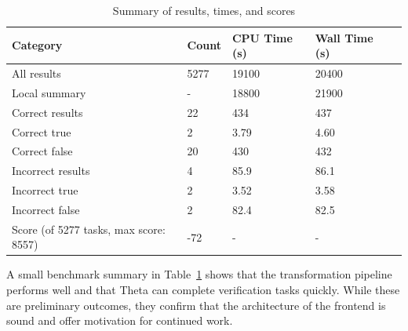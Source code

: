 \begin{table}[h]
\centering
\begin{tabular}{@{}lllll@{}}
\toprule
Category                     & Count & CPU Time (s) & Wall Time (s) \\ \midrule
All results                           & 5277  & 19100        & 20400         \\
Local summary                         & -     & 18800        & 21900         \\
\quad Correct results                      & 22    & 434          & 437           \\
\quad\quad Correct true                     & 2     & 3.79         & 4.60          \\
\quad\quad Correct false                    & 20    & 430          & 432           \\
\quad Incorrect results                    & 4     & 85.9         & 86.1          \\
\quad\quad Incorrect true                   & 2     & 3.52         & 3.58          \\
\quad\quad Incorrect false                  & 2     & 82.4         & 82.5          \\
Score (of 5277 tasks, max score: 8557)  & -72   & -            & -             \\ \bottomrule
\end{tabular}
\caption{ Summary of results, times, and scores }
\label{table:summary}
\end{table}

A small benchmark summary in Table~\ref{table:summary} shows that the transformation pipeline performs well and that Theta can complete verification tasks quickly. While these are preliminary outcomes, they confirm that the architecture of the frontend is sound and offer motivation for continued work.

